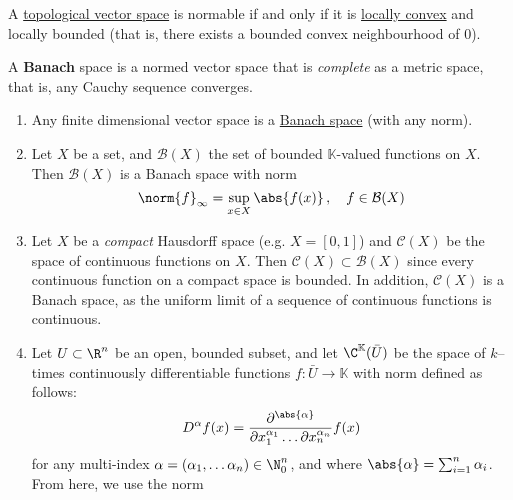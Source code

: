 \documentclass{article}
\newcommand{\K}{\mathbb{K}}
\begin{document}

\begin{cor}
    A \hyperlink{def:topologicalVectorSpace}{topological vector space} is normable if and only if it is \hyperlink{def:locallyConvex}{locally convex} and locally bounded (that is, there exists a bounded convex neighbourhood of $0$).
\end{cor}

\begin{defi}
    A \textbf{Banach} space is a normed vector space that is \emph{complete} as a metric space, that is, any Cauchy sequence converges.
\end{defi}

\begin{eg} \leavevmode
    \begin{enumerate}[label=(\roman*)]
        \item Any finite dimensional vector space is a \hyperlink{def:banach}{Banach space} (with any norm).
        \item Let $X$ be a set, and $\mathcal{B}(X)$ the set of bounded $\K$-valued functions on $X$.
            Then $\mathcal{B}(X)$ is a Banach space with norm
            \begin{equation*}
                \norm{f}_\infty = \sup_{x \in X} \abs{f(x)} \, , \quad f \in \mathcal{B}(X)
            \end{equation*}
        \item Let $X$ be a \emph{compact} Hausdorff space (e.g. $X = [0, 1]$) and $\mathcal{C}(X)$ be the space of continuous functions on $X$. Then $\mathcal{C}(X) \subset \mathcal{B}(X)$ since every continuous function on a compact space is bounded.
            In addition, $\mathcal{C}(X)$ is a Banach space, as the uniform limit of a sequence of continuous functions is continuous.
        \item Let $U \subset \R^n$ be an open, bounded subset, and let $\C^\K(\bar{U})$ be the space of $k$--times continuously differentiable functions $f: \bar{U} \to \K$ with norm defined as follows:
            \begin{equation*}
                D^\alpha f(x) = \frac{\partial^{\abs{\alpha}}}{\partial x_1^{\alpha_1} \dots \partial x_n^{\alpha_n}} f(x)
            \end{equation*}
            for any multi-index $\alpha = (\alpha_1, \dotsc \alpha_n) \in \N_0^n$, and where $\abs{\alpha} = \sum_{i=1}^n \alpha_i$.  From here, we use the norm
            \begin{equation*}

\end{equation*}
\end{enumerate}
\end{eg}
\end{document}
